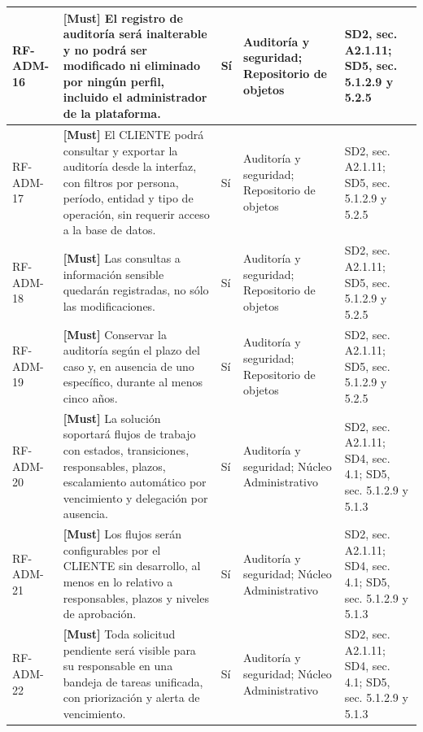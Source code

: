 \begin{paginaHorizontalSynaptix}
\begin{longtable}{|L{0.09\AnchoMatrizTDoce}|L{0.385\AnchoMatrizTDoce}|L{0.065\AnchoMatrizTDoce}|L{0.18\AnchoMatrizTDoce}|L{0.28\AnchoMatrizTDoce}|}
RF-\allowbreak{}ADM-\allowbreak{}16 &
\textbf{[Must]} El registro de auditoría será inalterable y no podrá ser modificado ni eliminado por ningún perfil, incluido el administrador de la plataforma. &
Sí &
Auditoría y seguridad; Repositorio de objetos &
SD2, sec. A2.1.11; SD5, sec. 5.1.2.9 y 5.2.5 \\ \hline

RF-\allowbreak{}ADM-\allowbreak{}17 &
\textbf{[Must]} El CLIENTE podrá consultar y exportar la auditoría desde la interfaz, con filtros por persona, período, entidad y tipo de operación, sin requerir acceso a la base de datos. &
Sí &
Auditoría y seguridad; Repositorio de objetos &
SD2, sec. A2.1.11; SD5, sec. 5.1.2.9 y 5.2.5 \\ \hline

RF-\allowbreak{}ADM-\allowbreak{}18 &
\textbf{[Must]} Las consultas a información sensible quedarán registradas, no sólo las modificaciones. &
Sí &
Auditoría y seguridad; Repositorio de objetos &
SD2, sec. A2.1.11; SD5, sec. 5.1.2.9 y 5.2.5 \\ \hline

RF-\allowbreak{}ADM-\allowbreak{}19 &
\textbf{[Must]} Conservar la auditoría según el plazo del caso y, en ausencia de uno específico, durante al menos cinco años. &
Sí &
Auditoría y seguridad; Repositorio de objetos &
SD2, sec. A2.1.11; SD5, sec. 5.1.2.9 y 5.2.5 \\ \hline

RF-\allowbreak{}ADM-\allowbreak{}20 &
\textbf{[Must]} La solución soportará flujos de trabajo con estados, transiciones, responsables, plazos, escalamiento automático por vencimiento y delegación por ausencia. &
Sí &
Auditoría y seguridad; Núcleo Administrativo &
SD2, sec. A2.1.11; SD4, sec. 4.1; SD5, sec. 5.1.2.9 y 5.1.3 \\ \hline

RF-\allowbreak{}ADM-\allowbreak{}21 &
\textbf{[Must]} Los flujos serán configurables por el CLIENTE sin desarrollo, al menos en lo relativo a responsables, plazos y niveles de aprobación. &
Sí &
Auditoría y seguridad; Núcleo Administrativo &
SD2, sec. A2.1.11; SD4, sec. 4.1; SD5, sec. 5.1.2.9 y 5.1.3 \\ \hline

RF-\allowbreak{}ADM-\allowbreak{}22 &
\textbf{[Must]} Toda solicitud pendiente será visible para su responsable en una bandeja de tareas unificada, con priorización y alerta de vencimiento. &
Sí &
Auditoría y seguridad; Núcleo Administrativo &
SD2, sec. A2.1.11; SD4, sec. 4.1; SD5, sec. 5.1.2.9 y 5.1.3 \\ \hline


\end{longtable}
\end{paginaHorizontalSynaptix}
